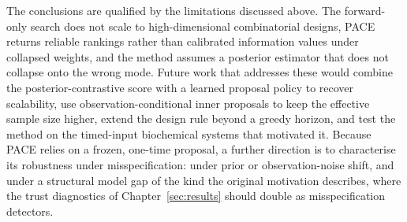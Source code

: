 The conclusions are qualified by the limitations discussed above. The forward-only
search does not scale to high-dimensional combinatorial designs, PACE returns
reliable rankings rather than calibrated information values under collapsed weights,
and the method assumes a posterior estimator that does not collapse onto the wrong
mode. Future work that addresses these would combine the posterior-contrastive score
with a learned proposal policy to recover scalability, use observation-conditional
inner proposals to keep the effective sample size higher, extend the design rule
beyond a greedy horizon, and test the method on the timed-input biochemical systems
that motivated it. Because PACE relies on a frozen, one-time proposal, a further
direction is to characterise its robustness under misspecification: under prior or
observation-noise shift, and under a structural model gap of the kind the original
motivation describes, where the trust diagnostics of Chapter~\ref{sec:results} should
double as misspecification detectors.
